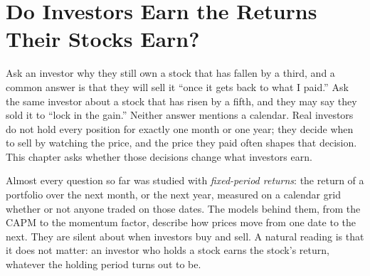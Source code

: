 \makeatletter
{}
\makeatother

\chapter{Do Investors Earn the Returns Their Stocks Earn?}
\label{ch:13}
\providecommand{\term}[1]{\emph{#1}}

Ask an investor why they still own a stock that has fallen by a third, and a common answer is that they will sell it ``once it gets back to what I paid.'' Ask the same investor about a stock that has risen by a fifth, and they may say they sold it to ``lock in the gain.'' Neither answer mentions a calendar. Real investors do not hold every position for exactly one month or one year; they decide when to sell by watching the price, and the price they paid often shapes that decision. This chapter asks whether those decisions change what investors earn.

Almost every question so far was studied with \term{fixed-period returns}: the return of a portfolio over the next month, or the next year, measured on a calendar grid whether or not anyone traded on those dates. The models behind them, from the CAPM to the momentum factor, describe how prices move from one date to the next. They are silent about when investors buy and sell. A natural reading is that it does not matter: an investor who holds a stock earns the stock's return, whatever the holding period turns out to be.

